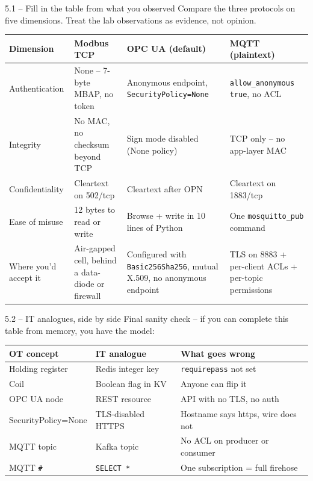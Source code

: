 \documentclass[11pt,a4paper]{article}
\begin{document}
\begin{stepbox}{5.1 -- Fill in the table from what you observed}
Compare the three protocols on five dimensions. Treat the lab observations
as evidence, not opinion.

\renewcommand{\arraystretch}{1.25}
\begin{center}\footnotesize
\begin{tabular}{@{}p{2.4cm}p{3.3cm}p{3.3cm}p{3.3cm}@{}}
\toprule
\textbf{Dimension} & \textbf{Modbus TCP} & \textbf{OPC UA (default)} & \textbf{MQTT (plaintext)} \\
\midrule
Authentication
  & None -- 7-byte MBAP, no token
  & Anonymous endpoint, \texttt{SecurityPolicy=None}
  & \texttt{allow\_anonymous true}, no ACL \\
Integrity
  & No MAC, no checksum beyond TCP
  & Sign mode disabled (None policy)
  & TCP only -- no app-layer MAC \\
Confidentiality
  & Cleartext on 502/tcp
  & Cleartext after OPN
  & Cleartext on 1883/tcp \\
Ease of misuse
  & 12 bytes to read or write
  & Browse + write in 10 lines of Python
  & One \texttt{mosquitto\_pub} command \\
Where you'd accept it
  & Air-gapped cell, behind a data-diode or firewall
  & Configured with \texttt{Basic256Sha256}, mutual X.509, no anonymous endpoint
  & TLS on 8883 + per-client ACLs + per-topic permissions \\
\bottomrule
\end{tabular}
\end{center}
\end{stepbox}

\begin{stepbox}{5.2 -- IT analogues, side by side}
Final sanity check -- if you can complete this table from memory, you
have the model:

\renewcommand{\arraystretch}{1.2}
\begin{center}\footnotesize
\begin{tabular}{@{}lll@{}}
\toprule
\textbf{OT concept} & \textbf{IT analogue} & \textbf{What goes wrong} \\
\midrule
Holding register   & Redis integer key      & \texttt{requirepass} not set \\
Coil               & Boolean flag in KV     & Anyone can flip it \\
OPC UA node        & REST resource          & API with no TLS, no auth \\
SecurityPolicy=None & TLS-disabled HTTPS    & Hostname says https, wire does not \\
MQTT topic         & Kafka topic            & No ACL on producer or consumer \\
MQTT \texttt{\#}   & \texttt{SELECT *}      & One subscription = full firehose \\
\bottomrule
\end{tabular}
\end{center}
\end{stepbox}
\end{document}
